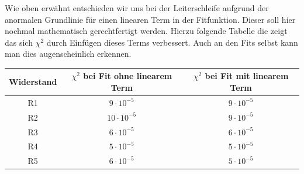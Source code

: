 \documentclass[12pt]{article}
\begin{document}
Wie oben erwähnt entschieden wir uns bei der Leiterschleife aufgrund der anormalen Grundlinie für einen linearen Term in der Fitfunktion. Dieser soll hier nochmal mathematisch gerechtfertigt werden. Hierzu folgende Tabelle die zeigt das sich $\chi^2$ durch Einfügen dieses Terms verbessert. Auch an den Fits selbst kann man dies augenscheinlich erkennen.

\begin{center}
\begin{tabular}{|c|cc|}
\hline
Widerstand & $\chi^2$ bei Fit ohne linearem Term & $\chi^2$ bei Fit mit linearem Term \\ 
\hline
R1 & $9 \cdot 10^{-5}$ & $9 \cdot 10^{-5}$ \\ 
R2 & $10 \cdot 10^{-5}$ & $9 \cdot 10^{-5}$ \\ 
R3 & $6 \cdot 10^{-5}$ & $6 \cdot 10^{-5}$ \\ 
R4 & $5 \cdot 10^{-5}$ & $5 \cdot 10^{-5}$ \\ 
R5 & $6 \cdot 10^{-5}$ & $5 \cdot 10^{-5}$ \\
\hline
\end{tabular}
\end{center}
\end{document}
